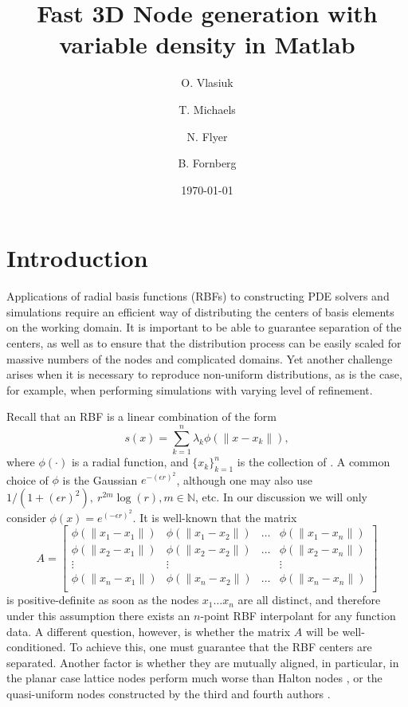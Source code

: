 \documentclass{amsart}
\title{Fast 3D Node generation with variable density in Matlab}
\author{O. Vlasiuk}
\author{T. Michaels}
\author{N. Flyer}
\author{B. Fornberg}
\date{\today}
\theoremstyle{definition}
\begin{document}
\maketitle
\section{Introduction}

Applications of radial basis functions (RBFs) to constructing PDE solvers and simulations require an efficient way of distributing the centers of basis elements on the working domain. It is important to be able to guarantee separation of the centers, as well as to ensure that the distribution process can be easily scaled for massive numbers of the nodes and complicated domains. Yet another challenge arises when it is necessary to reproduce non-uniform distributions, as is the case, for example, when performing simulations with varying level of refinement.

Recall \cite{Fornberg2015} that an RBF is a linear combination of the form
\begin{equation}\label{rbf}
s(x) = \sum_{k=1}^{n} \lambda_k \phi(\|x-x_k\|),
\end{equation}
where $ \phi(\cdot) $ is a radial function, and $ \{x_k\}_{k=1}^n $ is the collection of . A common choice of $ \phi $ is the Gaussian $ e^{-(\epsilon r)^2} $, although one may also use $ 1/(1+(\epsilon r)^2), \ r^{2m}\log(r), m\in\mathbb N $, etc. In our discussion we will only consider $ \phi(x) = e^{(-\epsilon r)^2} $. It is well-known that the matrix
\[ A =   \begin{bmatrix}
\phi(\|x_1-x_1\|)& \phi(\|x_1-x_2\|) & \ldots & \phi(\|x_1-x_n\|) \\ 
\phi(\|x_2-x_1\|)& \phi(\|x_2-x_2\|) & \ldots & \phi(\|x_2-x_n\|) \\
\vdots& \vdots  &  & \vdots  \\ 
\phi(\|x_n-x_1\|)& \phi(\|x_n-x_2\|) & \ldots & \phi(\|x_n-x_n\|) \\
\end{bmatrix}  \]
is positive-definite as soon as the nodes $ x_1\ldots x_n $ are all distinct, and therefore under this assumption there exists an $ n $-point RBF interpolant for any function data. A different question, however, is whether the matrix $ A $ will be well-conditioned. To achieve this, one must guarantee that the RBF centers are separated. Another factor is whether they are mutually aligned, in particular, in the planar case lattice nodes perform much worse than Halton nodes \cite{Fornberg2015}, or the quasi-uniform nodes constructed by the third and fourth authors \cite{Fornberg2015a}.
\end{document}
